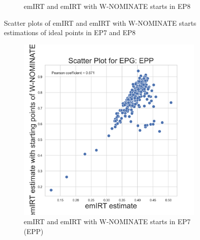 \documentclass[a4paper,12pt]{report}
\begin{document}
\begin{figure}[H]
\begin{subfigure}[b]{0.48\textwidth}
            \caption{emIRT and emIRT with W-NOMINATE starts in EP8}
            \label{fig:EMEIGEN_SCATTER_8}
        \end{subfigure}
        \caption{Scatter plots of emIRT and emIRT with W-NOMINATE starts estimations of ideal points in EP7 and EP8}
        \label{fig:EMEIGEN_SCATTER_7_8}
    \end{figure}
    \begin{figure}[H]
        \centering
        \begin{subfigure}[b]{0.48\textwidth}
            \centering
            \includegraphics[width=\textwidth]{Graphs/ScatterEMEIGEN_7_EPG_EPP}
            \caption{emIRT and emIRT with W-NOMINATE starts in EP7 (EPP)}
            \label{fig:EMEIGEN_SCATTER_7EPP}
        \end{subfigure}
        \hfill
        \begin{subfigure}[b]{0.48\textwidth}
            \centering

\end{subfigure}
\end{figure}
\end{document}
